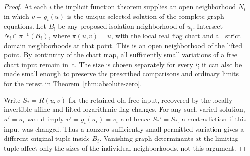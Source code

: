 \begin{proof}
At each $i$ the implicit function theorem supplies an open neighborhood
$N_i$ in which $v=g_i(u)$ is the unique selected solution of the
complete graph equations.  Let $B_i$ be any proposed isolation
neighborhood of $u_i$.  Intersect $N_i\cap\pi^{-1}(B_i)$, where
$\pi(u,v)=u$, with the local real flag chart and all strict domain
neighborhoods at that point.  This is an open neighborhood of the
lifted point.  By continuity of the chart map, all sufficiently small
variations of a free chart input remain in it.  The size is chosen
separately for every $i$; it can also be made small enough to preserve
the prescribed comparisons and ordinary limits for the retest in
Theorem~\ref{thm:absolute-zero}.

Write $S_*=R(u,v)$ for the retained old free input, recovered by the
locally invertible affine and lifted logarithmic flag changes.
For any such varied solution, $u'=u_i$ would imply
$v'=g_i(u_i)=v_i$ and hence $S_*'=S_*$, a contradiction if this
input was changed.  Thus a nonzero sufficiently small permitted
variation gives a different original tuple inside $B_i$.  Vanishing
graph determinants at the limiting tuple affect only the sizes of
the individual neighborhoods, not this argument.
\end{proof}

